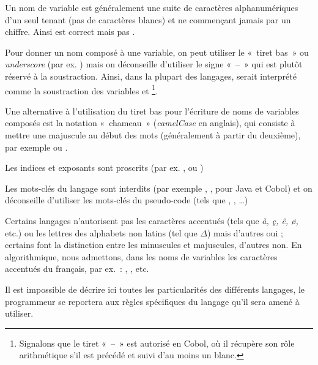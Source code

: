 			\begin{liste}
			\item 
				Un nom de variable est généralement une suite de caractères
				alphanumériques d’un seul tenant (pas de caractères blancs) et ne
				commençant jamais par un chiffre. 
				Ainsi  est correct mais pas . 
			\item 
				Pour donner un nom composé à une variable, 
				on peut utiliser le «~tiret bas~» ou \textit{underscore} 
				(par ex. ) 
				mais on déconseille d’utiliser le signe «~–~» 
				qui est plutôt réservé à la soustraction. 
				Ainsi, dans la plupart des langages,
				 serait interprété comme la
				soustraction des variables  et
				\footnote{%
					Signalons que le tiret \textcolor{black}{«~–~»} 
					est autorisé en Cobol, 
					où il récupère son rôle arithmétique 
					s’il est précédé et suivi d’au moins un blanc.
				}.
			\item 
				Une alternative à l’utilisation du tiret bas 
				pour l’écriture de noms de variables composés 
				est la notation «~chameau~» 
				(\textit{camelCase} en anglais), 
				qui consiste à mettre une majuscule au début des mots
				(généralement à partir du deuxième), 
				par exemple
				 ou
				.
			\item
				Les indices et exposants sont proscrits 
				(par ex.
				,
				 ou
				)
			\item{}
				Les mots-clés du langage sont interdits 
				(par exemple , ,  
				pour Java et Cobol) 
				et on déconseille d’utiliser les mots-clés du pseudo-code 
				(tels que
				, 
				, 
				\dots)
			\item
				Certains langages n’autorisent pas les caractères accentués 
				(tels que \textit{à, ç, ê, ø,} etc.) 
				ou les lettres des alphabets non latins
				(tel que ${\Delta}$) mais d’autres oui ; 
				certains font la distinction
				entre les minuscules et majuscules, d’autres non. 
				En algorithmique, nous admettons, dans les noms de variables 
				les caractères accentués du français,
				par ex.~: , 
				, etc.
			\end{liste}

			Il est impossible de décrire ici toutes les particularités des
			différents langages, le programmeur se reportera aux règles spécifiques
			du langage qu’il sera amené à utiliser.

